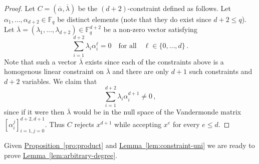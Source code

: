 \documentclass[10pt]{article}
\theoremstyle{definition}
\numberwithin{equation}{section}
\newcommand{\expref}[2]{\texorpdfstring{\hyperref[#2]{#1~\ref{#2}}}{#1~\ref{#2}}}
\newcommand{\F}{{\mathbb{F}}}
\begin{document}
\begin{proof}
Let $C=(\overline \alpha,\overline \lambda )$ be the $(d+2)$-constraint defined as follows.
Let $\alpha_1,\ldots,\alpha_{d+2} \in \F_q$ be distinct elements
(note that they do exist since $d+2 \leq q$).
Let ${\overline \lambda} = (\lambda_1,\ldots,\lambda_{d+2}) \in \F_q^{d+2}$
be a non-zero vector satisfying 
\[
\sum_{i=1}^{d+2} \lambda_i
\alpha_i^\ell = 0\quad\text{for all}\quad \ell \in \{0,\ldots,d\}\,.
\]
Note that such a vector ${\overline \lambda}$ exists since each of
the constraints above is a homogenous linear constraint on ${\overline \lambda}$
and there are only $d+1$ such constraints and $d+2$ variables.
We claim that
\[
\sum_{i=1}^{d+2} \lambda_i \alpha_i^{d+1} \ne 0\,,
\]
since
if it were then ${\overline \lambda}$ would be in the null space
of the Vandermonde matrix $[\alpha_i^j]_{i=1,j=0}^{d+2,d+1}$.
Thus $C$ rejects $x^{d+1}$ while accepting $x^{e}$
for every $e \leq d$.
\end{proof}

Given \expref{Proposition}{pro:product} and \expref{Lemma}{lem:constraint-uni} we are ready to prove \expref{Lemma}{lem:arbitrary-degree}.
\end{document}
